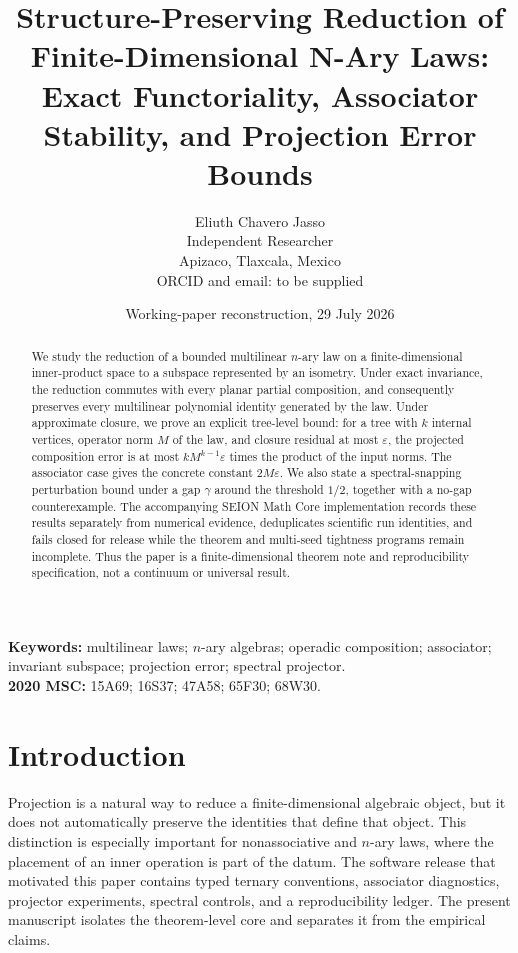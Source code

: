 \documentclass[11pt]{article}
\title{Structure-Preserving Reduction of Finite-Dimensional N-Ary Laws:\\
Exact Functoriality, Associator Stability, and Projection Error Bounds}
\author{Eliuth Chavero Jasso\\
\small Independent Researcher\\
\small Apizaco, Tlaxcala, Mexico\\
\small ORCID and email: to be supplied}
\date{Working-paper reconstruction, 29 July 2026}
\begin{document}
\maketitle

\begin{abstract}
We study the reduction of a bounded multilinear $n$-ary law on a finite-dimensional inner-product space to a subspace represented by an isometry. Under exact invariance, the reduction commutes with every planar partial composition, and consequently preserves every multilinear polynomial identity generated by the law. Under approximate closure, we prove an explicit tree-level bound: for a tree with $k$ internal vertices, operator norm $M$ of the law, and closure residual at most $\varepsilon$, the projected composition error is at most $kM^{k-1}\varepsilon$ times the product of the input norms. The associator case gives the concrete constant $2M\varepsilon$. We also state a spectral-snapping perturbation bound under a gap $\gamma$ around the threshold $1/2$, together with a no-gap counterexample. The accompanying SEION Math Core implementation records these results separately from numerical evidence, deduplicates scientific run identities, and fails closed for release while the theorem and multi-seed tightness programs remain incomplete. Thus the paper is a finite-dimensional theorem note and reproducibility specification, not a continuum or universal result.
\end{abstract}

\noindent\textbf{Keywords:} multilinear laws; $n$-ary algebras; operadic composition; associator; invariant subspace; projection error; spectral projector.\\
\noindent\textbf{2020 MSC:} 15A69; 16S37; 47A58; 65F30; 68W30.

\section{Introduction}

Projection is a natural way to reduce a finite-dimensional algebraic object, but it does not automatically preserve the identities that define that object. This distinction is especially important for nonassociative and $n$-ary laws, where the placement of an inner operation is part of the datum. The software release that motivated this paper contains typed ternary conventions, associator diagnostics, projector experiments, spectral controls, and a reproducibility ledger. The present manuscript isolates the theorem-level core and separates it from the empirical claims.
\end{document}
